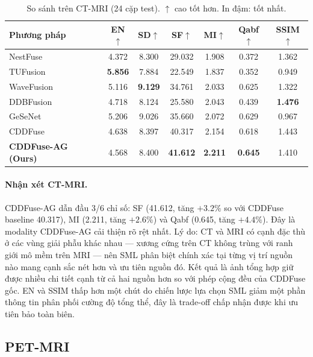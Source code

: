 \begin{table}[H]
\centering
\small
\caption[So sánh với SOTA trên CT-MRI (24 cặp test)]{So sánh trên CT-MRI (24 cặp test). $\uparrow$ cao tốt hơn. In đậm: tốt nhất.}
\label{tab:sota-ct}
\setlength{\tabcolsep}{4pt}
\begin{tabular}{lcccccc}
\toprule
\textbf{Phương pháp} & \textbf{EN}$\uparrow$ & \textbf{SD}$\uparrow$ & \textbf{SF}$\uparrow$ & \textbf{MI}$\uparrow$ & \textbf{Qabf}$\uparrow$ & \textbf{SSIM}$\uparrow$ \\
\midrule
NestFuse~\cite{li2020nestfuse}   & 4.372 & 8.300 & 29.032 & 1.908 & 0.372 & 1.362 \\
TUFusion~\cite{zhao2024tufusion} & \textbf{5.856} & 7.884 & 22.549 & 1.837 & 0.352 & 0.949 \\
WaveFusion~\cite{wang2025wavefusion} & 5.116 & \textbf{9.129} & 34.761 & 2.033 & 0.625 & 1.322 \\
DDBFusion~\cite{zhang2025ddbfusion}  & 4.718 & 8.124 & 25.580 & 2.043 & 0.439 & \textbf{1.476} \\
GeSeNet~\cite{li2023gesenet}    & 5.206 & 9.026 & 35.660 & 2.072 & 0.629 & 0.967 \\
CDDFuse~\cite{zhao2023cddfuse}  & 4.638 & 8.397 & 40.317 & 2.154 & 0.618 & 1.443 \\
\midrule
\textbf{CDDFuse-AG (Ours)} & 4.568 & 8.400 & \textbf{41.612} & \textbf{2.211} & \textbf{0.645} & 1.410 \\
\bottomrule
\end{tabular}
\end{table}

\paragraph{Nhận xét CT-MRI.}
CDDFuse-AG dẫn đầu 3/6 chỉ số: SF (41.612, tăng $+3.2\%$ so với CDDFuse baseline 40.317), MI (2.211, tăng $+2.6\%$) và Qabf (0.645, tăng $+4.4\%$). Đây là modality CDDFuse-AG cải thiện rõ rệt nhất. Lý do: CT và MRI có cạnh đặc thù ở các vùng giải phẫu khác nhau --- xương cứng trên CT không trùng với ranh giới mô mềm trên MRI --- nên SML phân biệt chính xác tại từng vị trí nguồn nào mang cạnh sắc nét hơn và ưu tiên nguồn đó. Kết quả là ảnh tổng hợp giữ được nhiều chi tiết cạnh từ cả hai nguồn hơn so với phép cộng đều của CDDFuse gốc. EN và SSIM thấp hơn một chút do chiến lược lựa chọn SML giảm một phần thông tin phân phối cường độ tổng thể, đây là trade-off chấp nhận được khi ưu tiên bảo toàn biên.

\subsection{PET-MRI}

